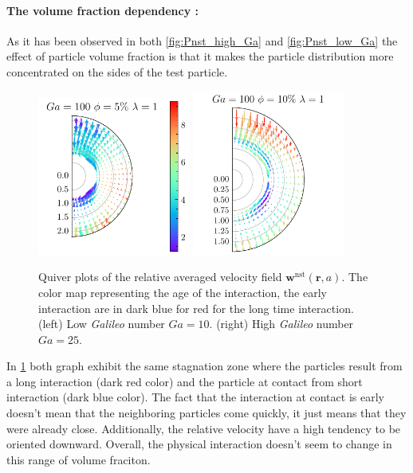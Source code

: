 \paragraph*{The volume fraction dependency :}
As it has been observed in both \ref{fig:Pnst_high_Ga} and \ref{fig:Pnst_low_Ga} the effect of particle volume fraction is that it makes the particle distribution more concentrated on the sides of the test particle. 
\begin{figure}[h!]
    \centering
    \includegraphics[width=5cm]{image/HOMOGENEOUS_NEW/Dist/U_rel_l_1_Ga_100_PHI_5.pdf}
    \includegraphics[width=5cm]{image/HOMOGENEOUS_NEW/Dist/U_rel_l_1_Ga_100_PHI_10.pdf}
    \caption{Quiver plots of the relative averaged velocity field $\textbf{w}^\text{nst}(\textbf{r},a)$.
    The color map representing the age of the interaction, the early interaction are in dark blue for red for the long time interaction.
    (left) Low \textit{Galileo} number $Ga = 10$.
    (right) High \textit{Galileo} number $Ga = 25$. }
    \label{fig:Why_Phi_matter}
\end{figure}
In \ref{fig:Why_Phi_matter} both graph exhibit the same stagnation zone where the particles result from a long interaction (dark red color) and the particle at contact from short interaction (dark blue color). 
The fact that the interaction at contact is early doesn't mean that the neighboring particles come quickly, it just means that they were already close. 
Additionally, the relative velocity have a high tendency to be oriented downward. 
Overall, the physical interaction doesn't seem to change in this range of volume fraciton. 

